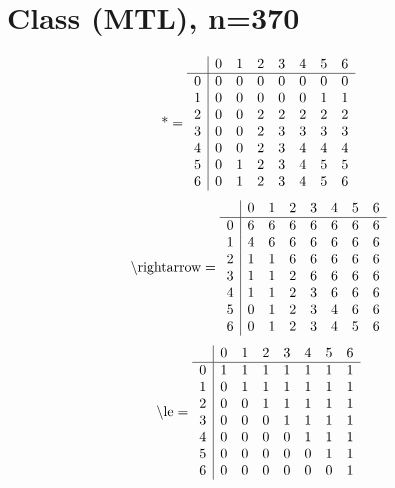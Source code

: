 \documentclass[11pt]{article}
\begin{document}
\section{Class (MTL), n=370}
\[\text{*} = 
\begin{array}{r | r r r r r r r}
 & 0 & 1 & 2 & 3 & 4 & 5 & 6 \\ \hline
0 & 0 & 0 & 0 & 0 & 0 & 0 & 0 \\
1 & 0 & 0 & 0 & 0 & 0 & 1 & 1 \\
2 & 0 & 0 & 2 & 2 & 2 & 2 & 2 \\
3 & 0 & 0 & 2 & 3 & 3 & 3 & 3 \\
4 & 0 & 0 & 2 & 3 & 4 & 4 & 4 \\
5 & 0 & 1 & 2 & 3 & 4 & 5 & 5 \\
6 & 0 & 1 & 2 & 3 & 4 & 5 & 6 \\
\end{array}
\]
\[\text{\textbackslash rightarrow} = 
\begin{array}{r | r r r r r r r}
 & 0 & 1 & 2 & 3 & 4 & 5 & 6 \\ \hline
0 & 6 & 6 & 6 & 6 & 6 & 6 & 6 \\
1 & 4 & 6 & 6 & 6 & 6 & 6 & 6 \\
2 & 1 & 1 & 6 & 6 & 6 & 6 & 6 \\
3 & 1 & 1 & 2 & 6 & 6 & 6 & 6 \\
4 & 1 & 1 & 2 & 3 & 6 & 6 & 6 \\
5 & 0 & 1 & 2 & 3 & 4 & 6 & 6 \\
6 & 0 & 1 & 2 & 3 & 4 & 5 & 6 \\
\end{array}
\]
\[\text{\textbackslash le} = 
\begin{array}{r | r r r r r r r}
 & 0 & 1 & 2 & 3 & 4 & 5 & 6 \\ \hline
0 & 1 & 1 & 1 & 1 & 1 & 1 & 1 \\
1 & 0 & 1 & 1 & 1 & 1 & 1 & 1 \\
2 & 0 & 0 & 1 & 1 & 1 & 1 & 1 \\
3 & 0 & 0 & 0 & 1 & 1 & 1 & 1 \\
4 & 0 & 0 & 0 & 0 & 1 & 1 & 1 \\
5 & 0 & 0 & 0 & 0 & 0 & 1 & 1 \\
6 & 0 & 0 & 0 & 0 & 0 & 0 & 1 \\
\end{array}
\]
\end{document}
